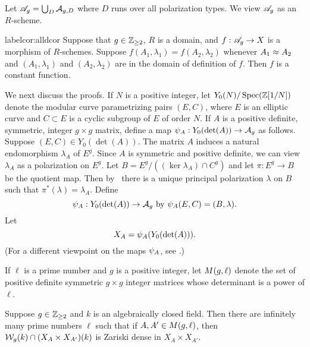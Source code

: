 \documentclass{amsart}
\begin{document}
Let
  $\mathscr{A}_g = \bigcup_{D} \mathcal{A}_{g,{D}}$
where $D$ runs over all polarization types. We view $\mathscr{A}_g$ as an $R$-scheme.
\begin{cor}
label{cor:alldcor}
  Suppose that $g\in\mathbb{Z}_{\ge 2}$, $R$ is a domain, and $f: \mathscr{A}_g \to X$ is a morphism of $R$-schemes. Suppose $f(A_1,\lambda_1) = f(A_2,\lambda_2)$ whenever $A_1 \approx A_2$ and $(A_1,\lambda_1)$ and $(A_2,\lambda_2)$ are in the domain of definition of $f$. Then $f$ is a constant function.
\end{cor}




We next discuss the proofs. 
If $N$ is a positive integer, let $Y_0(N)/\operatorname{Spec}(\mathbb{Z}[1/N])$ denote the modular curve parametrizing pairs $(E, C)$, where $E$ is an elliptic curve and $C \subset E$ is a cyclic subgroup of $E$ of order $N$. If $A$ is a positive definite, symmetric, integer $g\times g$ matrix, define a map $\psi_{A}: Y_0(\det(A)) \to \mathcal{A}_g$ as follows. Suppose $(E, C) \in Y_0(\det(A))$. The matrix $A$ induces a natural endomorphism $\lambda_A$ of $E^g$. Since $A$ is symmetric and positive definite, we can view $\lambda_A$ as a polarization on $E^g$. Let $B = E^g/((\ker \lambda_A) \cap C^g)$ and let $\pi: E^g \to B$ be the quotient map. Then by~\cite[Prop. 16.8]{milne-av} there is a unique principal polarization $\lambda$ on $B$ such that $\pi^*(\lambda) = \lambda_A$. Define
\begin{equation}\label{def:psimoddef}
\psi_{A}: Y_0(\det(A)) \to \mathcal{A}_g  \text{ by } \psi_{A}(E,C) = (B,\lambda).
\end{equation}
Let
$$X_A=\psi_{A}(Y_0(\det(A))).$$
(For a different viewpoint on the maps $\psi_{A}$, see \cite[p. 19 et seq.]{rains}.)

\begin{definition}\label{def:detl}
If $\ell$ is a prime number and $g$ is a positive integer, let $M(g,\ell)$ denote the set of positive definite symmetric $g \times g$ integer matrices whose determinant is a power of $\ell$.
\end{definition}

\begin{theorem}\label{thm:Sg-dense}
  Suppose $g\in\mathbb{Z}_{\ge 2}$ and $k$ is an algebraically closed field. 
  Then there are infinitely many prime numbers $\ell$ such that if
  $A,A' \in M(g,\ell)$, then $\mathcal{W}_g(k) \cap (X_A \times X_{A'})(k)$ is Zariski dense in $X_A \times X_{A'}$.
\end{theorem}
\end{document}
